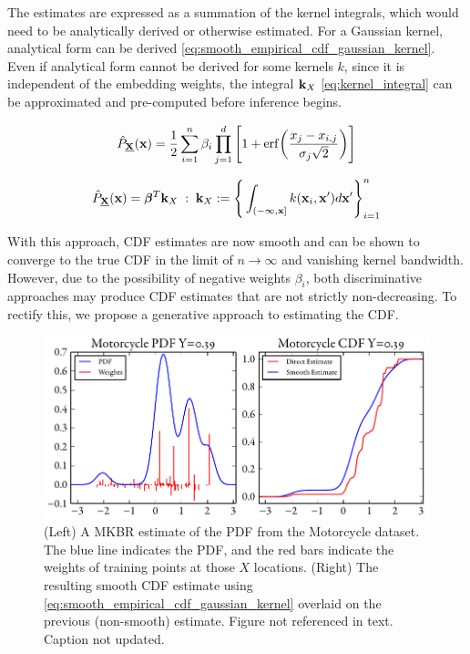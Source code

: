 \documentclass[twoside]{article} \usepackage{aistats2017}
\theoremstyle{definition}
\theoremstyle{remark}
\newcommand{\rv}[1]{\underline{#1}}
\newcommand{\ds}[1]{{#1}}
\newcommand{\warn}[1]{{\color{RedOrange} #1}}
\begin{document}
		The estimates are expressed as a summation of the kernel integrals, which would need to be analytically derived or otherwise estimated. For a Gaussian kernel, analytical form can be derived \eqref{eq:smooth_empirical_cdf_gaussian_kernel}. Even if analytical form cannot be derived for some kernels $k$, since it is independent of the embedding weights, the integral $\bvec{k}_{\ds{X}}$ \eqref{eq:kernel_integral} can be approximated and pre-computed before inference begins.

		\begin{equation}
			\hat{P}_{\bvec{\rv{X}}}(\bvec{x}) = \frac{1}{2} \sum_{i = 1}^{n} \beta_{i} \prod_{j = 1}^{d} \Bigg[1 + \mathrm{erf}\bigg(\frac{x_{j} - x_{i, j}}{\sigma_{j} \sqrt{2}}\bigg)\Bigg]
		\label{eq:smooth_empirical_cdf_gaussian_kernel}
		\end{equation}

		\begin{equation}
			\hat{P}_{\bvec{\rv{X}}}(\bvec{x}) = \bm{\beta}^{T} \bvec{k}_{\ds{X}} \; : \; \bvec{k}_{\ds{X}} := \Bigg\{ \int_{(-\bvec{\infty}, \bvec{x}]}  k(\bvec{x}_{i}, \bvec{x}') d\bvec{x}' \Bigg\}_{i = 1}^{n}
		\label{eq:kernel_integral}
		\end{equation}
			
		With this approach, CDF estimates are now smooth and can be shown to converge to the true CDF in the limit of $n \rightarrow \infty$ and vanishing kernel bandwidth. However, due to the possibility of negative weights $\beta_{i}$, both discriminative approaches may produce CDF estimates that are not strictly non-decreasing. To rectify this, we propose a generative approach to estimating the CDF.

		\begin{figure}
			\begin{center}
				\includegraphics[width=\columnwidth]{figures/cumulativeexamplesmooth}
			\end{center}
			\caption{\small (Left) A MKBR estimate of the PDF from the Motorcycle dataset. The blue line indicates the PDF, and the red bars indicate the weights of training points at those $X$ locations. (Right) The resulting smooth CDF estimate using \eqref{eq:smooth_empirical_cdf_gaussian_kernel} overlaid on the previous (non-smooth) estimate. \warn{Figure not referenced in text. Caption not updated.}}
			\label{fig:cumulativeexamplesmooth}
		\end{figure}
\end{document}
